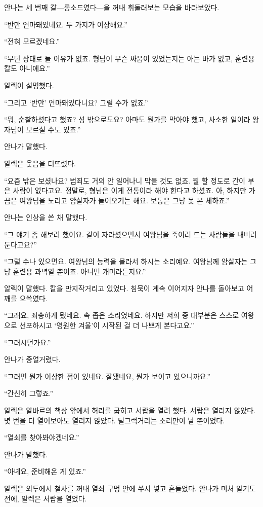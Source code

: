안나는 세 번째 칼—롱소드였다—을 꺼내 휘둘러보는 모습을 바라보았다.

``반만 연마돼있네요. 두 가지가 이상해요.''

``전혀 모르겠네요.''

``무딘 상태로 둘 이유가 없죠. 형님이 무슨 싸움이 있었는지는 아는 바가 없고, 훈련용 칼도 아니에요.''

알렉이 설명했다.

``그리고 `반만' 연마돼있다니요? 그럴 수가 없죠.''

``뭐, 순찰하셨다고 했죠? 성 밖으로도요? 아마도 뭔가를 막아야 했고, 사소한 일이라 왕자님이 모르실 수도 있죠.''

안나가 말했다.

알렉은 웃음을 터뜨렸다.

``요즘 밖은 보셨나요? 범죄도 거의 안 일어나니 막을 것도 없죠. 뭘 할 정도로 간이 부은 사람이 없다고요. 정말로, 형님은 이게 전통이라 해야 한다고 하셨죠. 아, 하지만 가끔은 여왕님을 노리고 암살자가 들어오기는 해요. 보통은 그냥 못 본 체하죠.''

안나는 인상을 쓴 채 말했다.

``그 얘기 좀 해보려 했어요. 같이 자라셨으면서 여왕님을 죽이려 드는 사람들을 내버려 둔다고요?''

``그럴 수나 있으면요. 여왕님의 능력을 몰라서 하시는 소리예요. 여왕님께 암살자는 그냥 훈련용 과녁일 뿐이죠. 아니면 개미라든지요.''

알렉이 말했다. 칼을 만지작거리고 있었다. 침묵이 계속 이어지자 안나를 돌아보고 어깨를 으쓱였다.

``그래요, 죄송하게 됐네요. 속 좁은 소리였네요. 하지만 저희 중 대부분은 스스로 여왕으로 선포하시고 `영원한 겨울'이 시작된 걸 더 나쁘게 본다고요.''

``그러시던가요.''

안나가 중얼거렸다.

``그러면 뭔가 이상한 점이 있네요. 잘됐네요, 뭔가 보이고 있으니까요.''

``간신히 그렇죠.''

알렉은 알바르의 책상 앞에서 허리를 굽히고 서랍을 열려 했다. 서랍은 열리지 않았다. 몇 번을 더 열어보아도 열리지 않았다. 덜그럭거리는 소리만이 날 뿐이었다.

``열쇠를 찾아봐야겠네요.''

안나가 말했다.

``아녜요, 준비해온 게 있죠.''

알렉은 외투에서 철사를 꺼내 열쇠 구멍 안에 쑤셔 넣고 흔들었다. 안나가 미처 알기도 전에, 알렉은 서랍을 열었다.

